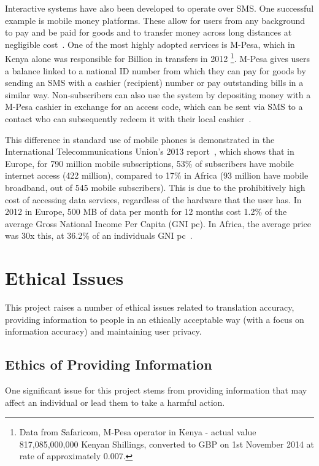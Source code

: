 \documentclass[authoryearcitations]{UoYCSproject}
\begin{document}
Interactive systems have also been developed to operate over SMS.  One successful example is mobile money platforms.  These allow for users from any background to pay and be paid for goods and to transfer money across long distances at negligible cost~\cite{Aker_Mobile_Phones_2010}.  One of the most highly adopted services is M-Pesa, which in Kenya alone was responsible for  Billion in transfers in 2012 \footnote{Data from Safaricom, M-Pesa operator in Kenya - actual value 817,085,000,000 Kenyan Shillings, converted to GBP on 1st November 2014 at rate of approximately 0.007.}.  M-Pesa gives users a balance linked to a national ID number from which they can pay for goods by sending an SMS with a cashier (recipient) number or pay outstanding bills in a similar way.  Non-subscribers can also use the system by depositing money with a M-Pesa cashier in exchange for an access code, which can be sent via SMS to a contact who can subsequently redeem it with their local cashier~\cite{Aker_Mobile_Phones_2010}.

This difference in standard use of mobile phones is demonstrated in the International Telecommunications Union's 2013 report~\cite{ITU_Cell_Usage_2013}, which shows that in Europe, for 790 million mobile subscriptions, 53\% of subscribers have mobile internet access (422 million), compared to 17\% in Africa (93 million have mobile broadband, out of 545 mobile subscribers).  This is due to the prohibitively high cost of accessing data services, regardless of the hardware that the user has.  In 2012 in Europe, 500 MB of data per month for 12 months cost 1.2\% of the average Gross National Income Per Capita (GNI pc).  In Africa, the average price was 30x this, at 36.2\% of an individuals GNI pc~\cite{ITU_Information_Society_2013}.


\section{Ethical Issues}
This project raises a number of ethical issues related to translation accuracy, providing information to people in an ethically acceptable way (with a focus on information accuracy) and maintaining user privacy.

\subsection{Ethics of Providing Information}
One significant issue for this project stems from providing information that may affect an individual or lead them to take a harmful action.
\end{document}
